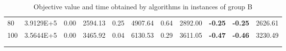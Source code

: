 {\begin{longtable}{@{}llccccccccc@{}}
\multicolumn{1}{l|}{80}  & \multicolumn{1}{l|}{3.9129E+5}  & 0.00 & \multicolumn{1}{c|}{2594.13} & 0.25 & \multicolumn{1}{c|}{4907.64} & 0.64 & \multicolumn{1}{c|}{2892.00} & \textbf{-0.25} & \textbf{-0.25} & 2626.61 \\
\multicolumn{1}{l|}{100} & \multicolumn{1}{l|}{3.5644E+5}  & 0.00 & \multicolumn{1}{c|}{3465.92} & 0.04 & \multicolumn{1}{c|}{6130.53} & 0.29 & \multicolumn{1}{c|}{3611.05} & \textbf{-0.47} & \textbf{-0.46} & 3230.49 \\ \hline
\caption{Objective value and time obtained by algorithms in instances of group B}\\
\label{results-all-B}\\
\end{longtable}}